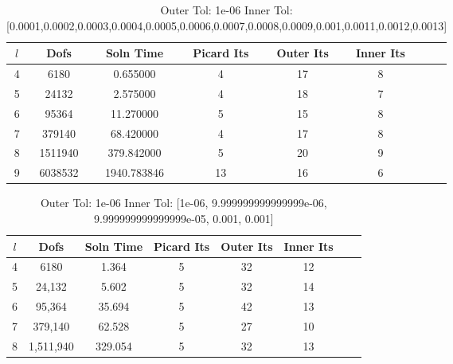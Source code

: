 \documentclass{article}
\begin{document}
\begin{table}[h!] \small
\begin{center}
\begin{tabular}{cccccccc}
\hline
$l$ &    Dofs & Soln Time & Picard Its & Outer Its & Inner Its \\
\hline
4 &     6180 &     0.655000 &                  4 &         17 &          8 \\
5 &    24132 &     2.575000 &                  4 &         18 &          7 \\
6 &    95364 &    11.270000 &                  5 &         15 &          8 \\
7 &   379140 &    68.420000 &                  4 &         17 &          8 \\
8 &  1511940 &   379.842000 &                  5 &         20 &          9 \\
9 &  6038532 &  1940.783846 &                 13 &         16 &          6 \\
\hline
\end{tabular}
\caption{Outer Tol:   1e-06 Inner Tol:    [0.0001,0.0002,0.0003,0.0004,0.0005,0.0006,0.0007,0.0008,0.0009,0.001,0.0011,0.0012,0.0013]}

\end{center}
\end{table}
\begin{table}[h!] \small
\begin{center}
\begin{tabular}{cccccccc}
\hline
$l$ &    Dofs & Soln Time & Picard Its & Outer Its & Inner Its \\
\hline
 4 &     6180 &      1.364 &                  5 &         32 &         12 \\
 5 &    24,132 &      5.602 &                  5 &         32 &         14 \\
 6 &    95,364 &     35.694 &                  5 &         42 &         13 \\
 7 &   379,140 &     62.528 &                  5 &         27 &         10 \\
 8 &  1,511,940 &    329.054 &                  5 &         32 &         13 \\
\hline
\end{tabular}
\caption{Outer Tol:   1e-06 Inner Tol:    [1e-06, 9.999999999999999e-06, 9.999999999999999e-05, 0.001, 0.001]}

\end{center}
\end{table}
\end{document}
